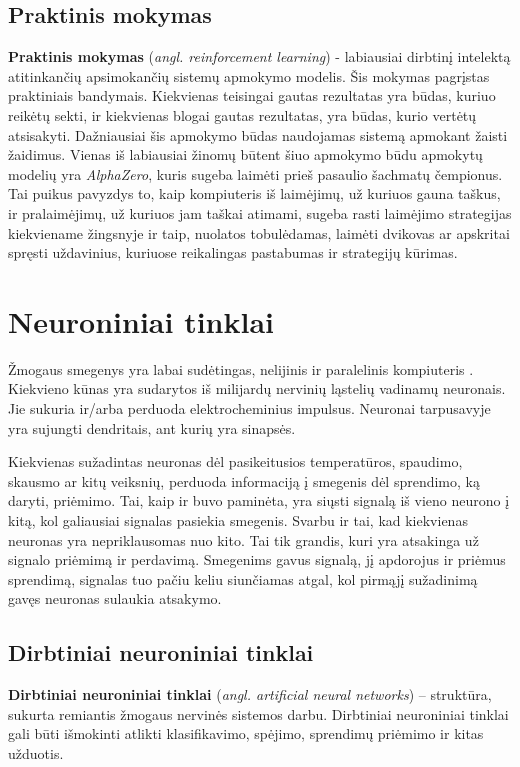 \documentclass{VUMIFPSbakalaurinis}
\begin{document}
\subsection{Praktinis mokymas}
\textbf{Praktinis mokymas} (\textit{angl. reinforcement learning}) - labiausiai dirbtinį intelektą atitinkančių apsimokančių sistemų apmokymo modelis. Šis mokymas pagrįstas praktiniais bandymais. Kiekvienas teisingai gautas rezultatas yra būdas, kuriuo reikėtų sekti, ir kiekvienas blogai gautas rezultatas, yra būdas, kurio vertėtų atsisakyti. Dažniausiai šis apmokymo būdas naudojamas sistemą apmokant žaisti žaidimus. Vienas iš labiausiai žinomų būtent šiuo apmokymo būdu apmokytų modelių yra \textit{AlphaZero}, kuris sugeba laimėti prieš pasaulio šachmatų čempionus. Tai puikus pavyzdys to, kaip kompiuteris iš laimėjimų, už kuriuos gauna taškus, ir pralaimėjimų, už kuriuos jam taškai atimami, sugeba rasti laimėjimo strategijas kiekviename žingsnyje ir taip, nuolatos tobulėdamas, laimėti dvikovas ar apskritai spręsti uždavinius, kuriuose reikalingas pastabumas ir strategijų kūrimas.


\section{Neuroniniai tinklai}
Žmogaus smegenys yra labai sudėtingas, nelijinis ir paralelinis kompiuteris \cite{Hay09}. Kiekvieno kūnas yra sudarytos iš milijardų nervinių ląstelių vadinamų neuronais. Jie sukuria ir/arba perduoda elektrocheminius impulsus. Neuronai tarpusavyje yra sujungti dendritais, ant kurių yra sinapsės. 

Kiekvienas sužadintas neuronas dėl pasikeitusios temperatūros, spaudimo, skausmo ar kitų veiksnių, perduoda informaciją į smegenis dėl sprendimo, ką daryti, priėmimo. Tai, kaip ir buvo paminėta, yra siųsti signalą iš vieno neurono į kitą, kol galiausiai signalas pasiekia smegenis. Svarbu ir tai, kad kiekvienas neuronas yra nepriklausomas nuo kito. Tai tik grandis, kuri yra atsakinga už signalo priėmimą ir perdavimą. Smegenims gavus signalą, jį apdorojus ir priėmus sprendimą, signalas tuo pačiu keliu siunčiamas atgal, kol pirmąjį sužadinimą gavęs neuronas sulaukia atsakymo. 

\subsection{Dirbtiniai neuroniniai tinklai}
\textbf{Dirbtiniai neuroniniai tinklai} (\textit{angl. artificial neural networks}) – struktūra, sukurta remiantis žmogaus nervinės sistemos darbu. Dirbtiniai neuroniniai tinklai gali būti išmokinti atlikti klasifikavimo, spėjimo, sprendimų priėmimo ir kitas užduotis. 
\end{document}

